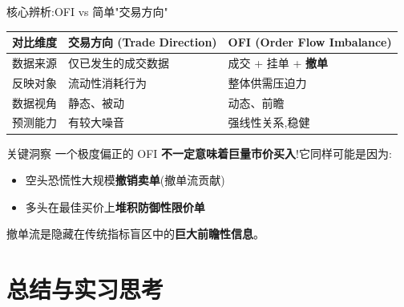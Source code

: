 \documentclass[10pt,aspectratio=169]{beamer}
\begin{document}
\begin{frame}{核心辨析:OFI vs 简单"交易方向"}

  \small
  \begin{tabular}{p{3.0cm}|p{4.2cm}|p{4.5cm}}
    \toprule
    \textbf{对比维度} & \textbf{交易方向 (Trade Direction)} & \textbf{OFI (Order Flow Imbalance)} \\
    \midrule
    数据来源 & 仅已发生的成交数据 & 成交 + 挂单 + \textbf{撤单} \\
    反映对象 & 流动性消耗行为 & 整体供需压迫力 \\
    数据视角 & 静态、被动 & 动态、前瞻 \\
    预测能力 & 有较大噪音 & 强线性关系,稳健 \\
    \bottomrule
  \end{tabular}

  \vfill

  \begin{alertblock}{关键洞察}
    一个极度偏正的 OFI \textbf{不一定意味着巨量市价买入}!它同样可能是因为:
    \begin{itemize}
      \item 空头恐慌性大规模\textbf{撤销卖单}(撤单流贡献)
      \item 多头在最佳买价上\textbf{堆积防御性限价单}
    \end{itemize}
    撤单流是隐藏在传统指标盲区中的\textbf{巨大前瞻性信息}。
  \end{alertblock}

\end{frame}



\section{总结与实习思考}
\end{document}
